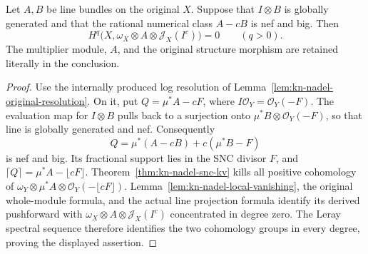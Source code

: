 \begin{theorem}
\label{thm:kn-nadel-original-target}
\notready
Let $A,B$ be line bundles on the original $X$.  Suppose that
$I\otimes B$ is globally generated and that the rational numerical class
$A-cB$ is nef and big.  Then
\[
 H^q\bigl(X,\omega_X\otimes A\otimes\mathcal J_X(I^c)\bigr)=0
 \qquad(q>0).
\]
The multiplier module, $A$, and the original structure morphism are
retained literally in the conclusion.
\end{theorem}
\begin{proof}
Use the internally produced log resolution of
Lemma~\ref{lem:kn-nadel-original-resolution}.  On it, put
$Q=\mu^*A-cF$, where $I\mathcal O_Y=\mathcal O_Y(-F)$.
The evaluation map for $I\otimes B$ pulls back to a surjection onto
$\mu^*B\otimes\mathcal O_Y(-F)$, so that line is globally generated
and nef.  Consequently
\[
 Q=\mu^*(A-cB)+c(\mu^*B-F)
\]
is nef and big.  Its fractional support lies in the SNC divisor $F$,
and $\lceil Q\rceil=\mu^*A-\lfloor cF\rfloor$.
Theorem~\ref{thm:kn-nadel-snc-kv} kills all positive cohomology of
$\omega_Y\otimes\mu^*A\otimes\mathcal O_Y(-\lfloor cF\rfloor)$.
Lemma~\ref{lem:kn-nadel-local-vanishing}, the original whole-module
formula, and the actual line projection formula identify its derived
pushforward with
$\omega_X\otimes A\otimes\mathcal J_X(I^c)$ concentrated in degree zero.
The Leray spectral sequence therefore identifies the two cohomology
groups in every degree, proving the displayed assertion.
\end{proof}

